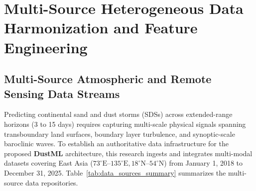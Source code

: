
\chapter{Multi-Source Heterogeneous Data Harmonization and Feature Engineering}
\label{chap:data_harmonization}

\section{Multi-Source Atmospheric and Remote Sensing Data Streams}
\label{sec:data_sources}

Predicting continental sand and dust storms (SDSs) across extended-range horizons (3 to 15 days) requires capturing multi-scale physical signals spanning transboundary land surfaces, boundary layer turbulence, and synoptic-scale baroclinic waves. To establish an authoritative data infrastructure for the proposed \textbf{DustML} architecture, this research ingests and integrates multi-modal datasets covering East Asia ($73^\circ\text{E}\text{--}135^\circ\text{E}, 18^\circ\text{N}\text{--}54^\circ\text{N}$) from January 1, 2018 to December 31, 2025. Table~\ref{tab:data_sources_summary} summarizes the multi-source data repositories.

